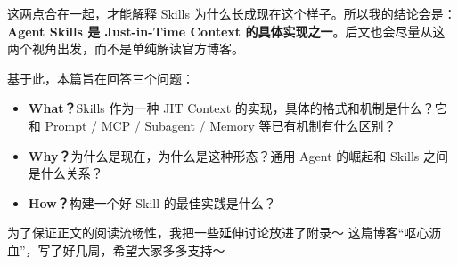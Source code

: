 这两点合在一起，才能解释 Skills 为什么长成现在这个样子。所以我的结论会是：\textbf{Agent Skills 是 Just-in-Time Context 的具体实现之一}。后文也会尽量从这两个视角出发，而不是单纯解读官方博客。

基于此，本篇旨在回答三个问题：

\begin{itemize}
  \item \textbf{What？}Skills 作为一种 JIT Context 的实现，具体的格式和机制是什么？它和 Prompt / MCP / Subagent / Memory 等已有机制有什么区别？
  \item \textbf{Why？}为什么是现在，为什么是这种形态？通用 Agent 的崛起和 Skills 之间是什么关系？
  \item \textbf{How？}构建一个好 Skill 的最佳实践是什么？
\end{itemize}

为了保证正文的阅读流畅性，我把一些延伸讨论放进了附录～ 这篇博客“呕心沥血”，写了好几周，希望大家多多支持～
